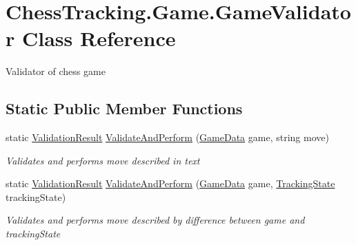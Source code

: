 \hypertarget{class_chess_tracking_1_1_game_1_1_game_validator}{}\section{Chess\+Tracking.\+Game.\+Game\+Validator Class Reference}
\label{class_chess_tracking_1_1_game_1_1_game_validator}


Validator of chess game  


\subsection*{Static Public Member Functions}
\begin{DoxyCompactItemize}
\item 
static \mbox{\hyperlink{class_chess_tracking_1_1_game_1_1_validation_result}{Validation\+Result}} \mbox{\hyperlink{class_chess_tracking_1_1_game_1_1_game_validator_a55036629d94e4cb6960bad9a10a8635a}{Validate\+And\+Perform}} (\mbox{\hyperlink{class_chess_tracking_1_1_game_1_1_game_data}{Game\+Data}} game, string move)
\begin{DoxyCompactList}\small\item\em Validates and performs move described in text \end{DoxyCompactList}\item 
static \mbox{\hyperlink{class_chess_tracking_1_1_game_1_1_validation_result}{Validation\+Result}} \mbox{\hyperlink{class_chess_tracking_1_1_game_1_1_game_validator_a5ab7f254ae447333762ff20d983c9899}{Validate\+And\+Perform}} (\mbox{\hyperlink{class_chess_tracking_1_1_game_1_1_game_data}{Game\+Data}} game, \mbox{\hyperlink{class_chess_tracking_1_1_multithreading_messages_1_1_tracking_state}{Tracking\+State}} tracking\+State)
\begin{DoxyCompactList}\small\item\em Validates and performs move described by difference between game and tracking\+State \end{DoxyCompactList}\end{DoxyCompactItemize}
